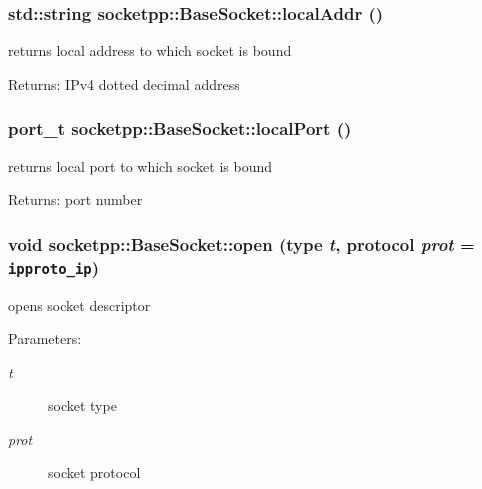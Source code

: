 \begin{CompactItemize}
{\subsubsection[{localAddr}]{\setlength{\rightskip}{0pt plus 5cm}std::string socketpp::BaseSocket::localAddr ()}}
\label{classsocketpp_1_1BaseSocket_0caed2e7d3f0e4db7d4c1aa3aba52caf}


returns local address to which socket is bound 

\begin{Desc}
\item[Returns:]IPv4 dotted decimal address \end{Desc}
\hypertarget{classsocketpp_1_1BaseSocket_d4a2c0e4932436ef61f911514385d16c}{
\subsubsection[{localPort}]{\setlength{\rightskip}{0pt plus 5cm}port\_\-t socketpp::BaseSocket::localPort ()}}
\label{classsocketpp_1_1BaseSocket_d4a2c0e4932436ef61f911514385d16c}


returns local port to which socket is bound 

\begin{Desc}
\item[Returns:]port number \end{Desc}
\hypertarget{classsocketpp_1_1BaseSocket_2060dc1b648f83f8bf5ae3d9ecfcd619}{
\subsubsection[{open}]{\setlength{\rightskip}{0pt plus 5cm}void socketpp::BaseSocket::open (type {\em t}, \/  protocol {\em prot} = {\tt ipproto\_\-ip})}}
\label{classsocketpp_1_1BaseSocket_2060dc1b648f83f8bf5ae3d9ecfcd619}


opens socket descriptor 

\begin{Desc}
\item[Parameters:]
\begin{description}
\item[{\em t}]socket type \item[{\em prot}]socket protocol \end{description}
\end{Desc}
\hypertarget{classsocketpp_1_1BaseSocket_d36a1139d9e931d172e9c45171609b66}{
}
\end{CompactItemize}
